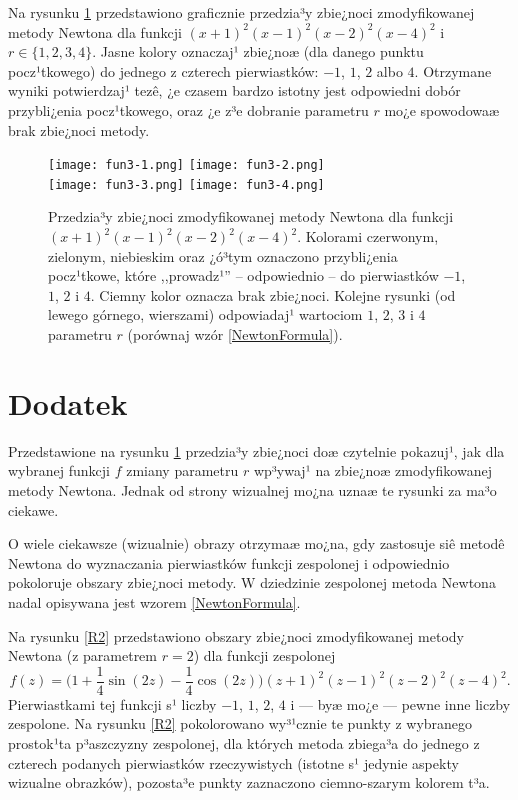 \documentclass[a4paper,12pt]{article}
\begin{document}
Na rysunku \ref{R1} przedstawiono graficznie przedzia³y zbie¿noci zmodyfikowanej
metody Newtona dla funkcji $(x+1)^2(x-1)^2(x-2)^2(x-4)^2$ i $r\in\{1,2,3,4\}$.
Jasne kolory oznaczaj¹ zbie¿noæ (dla danego punktu pocz¹tkowego) do jednego
z czterech pierwiastków: $-1$, $1$, $2$ albo $4$. Otrzymane wyniki potwierdzaj¹
tezê, ¿e czasem bardzo istotny jest odpowiedni dobór przybli¿enia pocz¹tkowego, oraz
¿e z³e dobranie parametru $r$ mo¿e spowodowaæ brak zbie¿noci metody.

\begin{figure}[h!]
\begin{center}
\texttt{[image: fun3-1.png]}\hspace*{-4ex}
\texttt{[image: fun3-2.png]}\\[1ex]
\texttt{[image: fun3-3.png]}\hspace*{-4ex}
\texttt{[image: fun3-4.png]}\vspace*{-4ex}
\end{center}
\caption{\footnotesize Przedzia³y zbie¿noci zmodyfikowanej metody Newtona dla funkcji
$(x+1)^2(x-1)^2(x-2)^2(x-4)^2$. Kolorami czerwonym, zielonym, niebieskim oraz ¿ó³tym oznaczono
przybli¿enia pocz¹tkowe, które ,,prowadz¹'' -- odpowiednio -- do pierwiastków
$-1$, $1$, $2$ i $4$. Ciemny kolor oznacza brak zbie¿noci. Kolejne rysunki (od lewego
górnego, wierszami) odpowiadaj¹ wartociom $1$, $2$, $3$ i $4$ parametru $r$
(porównaj wzór \eqref{NewtonFormula}).}
\label{R1}
\end{figure}


\section*{Dodatek}

Przedstawione na rysunku \ref{R1} przedzia³y zbie¿noci doæ czytelnie pokazuj¹, jak
dla wybranej funkcji $f$ zmiany parametru $r$ wp³ywaj¹ na zbie¿noæ zmodyfikowanej
metody Newtona. Jednak od strony wizualnej mo¿na uznaæ te rysunki za ma³o ciekawe.

O wiele ciekawsze (wizualnie) obrazy otrzymaæ mo¿na, gdy zastosuje siê metodê Newtona
do wyznaczania pierwiastków funkcji zespolonej i odpowiednio pokoloruje obszary
zbie¿noci metody. W dziedzinie zespolonej metoda Newtona nadal opisywana jest
wzorem \eqref{NewtonFormula}.

Na rysunku \ref{R2} przedstawiono obszary zbie¿noci zmodyfikowanej metody Newtona
(z parametrem $r=2$) dla funkcji zespolonej
\begin{equation}
\label{FractFunct}
  f(z) = \big(1 + \frac{1}{4}\sin(2z) - \frac{1}{4}\cos(2z)\big)
         (z+1)^2(z-1)^2(z-2)^2(z-4)^2.
\end{equation}
Pierwiastkami tej funkcji s¹ liczby $-1$, $1$, $2$, $4$ i --- byæ mo¿e --- pewne
inne liczby zespolone. Na rysunku \ref{R2} pokolorowano wy³¹cznie te punkty z wybranego
prostok¹ta p³aszczyzny zespolonej, dla których metoda zbiega³a do jednego z czterech
podanych pierwiastków rzeczywistych (istotne s¹ jedynie aspekty wizualne obrazków),
pozosta³e punkty zaznaczono ciemno-szarym kolorem t³a.
\end{document}
